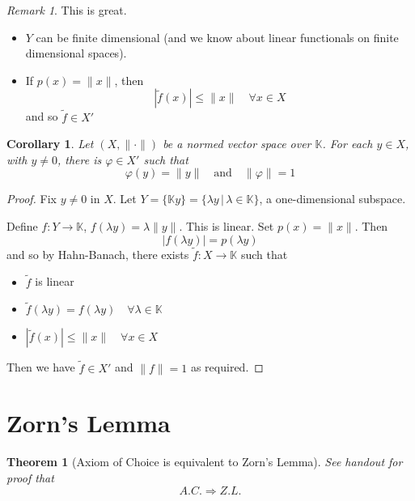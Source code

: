 \documentclass[justified]{tufte-book}
\theoremstyle{plain}%
\newtheorem{thm}{Theorem}[chapter]
\newtheorem*{cor}{Corollary}
\theoremstyle{definition}
\theoremstyle{remark}
\newtheorem*{rem}{Remark}
\newcommand{\given}{ \, | \,}
\newcommand{\K}{\mathbb{K}}
\renewcommand{\phi}{\varphi}
\begin{document}
\begin{rem}
  This is great.
  \begin{itemize}
      \item $Y$ can be finite dimensional (and we know about linear functionals on finite dimensional spaces).
      \item If $p(x) = \| x \|$, then \[
          |\tilde f (x) | \leq \|x \| \quad \forall x \in X
      \] and so $\tilde f \in X'$
  \end{itemize}
\end{rem}

\begin{cor}
  Let $(X, \| \cdot \|)$ be a normed vector space over $\K$.  For each $y \in X$, with $y \neq 0$, there is $\phi \in X'$ such that \[
      \phi(y) = \| y \| \quad \text{and} \quad \| \phi \| = 1
  \]
\end{cor}
\begin{proof}
  Fix $y \neq 0$ in $X$.  Let $Y = \{ \K y \} = \{ \lambda y \given \lambda \in \K \}$, a one-dimensional subspace.  
  
  Define $f : Y \rightarrow \K$, $f( \lambda y) = \lambda \| y \|$.  This is linear.  Set $p(x) = \| x \|$.  Then \[
      | f(\lambda y )| = p(\lambda y)
  \] and so by Hahn-Banach, there exists $\tilde f : X \rightarrow \K$ such that
  \begin{itemize}
      \item $\tilde f$ is linear
      \item $\tilde f(\lambda y) = f( \lambda y) \quad \forall \lambda \in \K$
      \item $| \tilde f (x) | \leq \| x \| \quad \forall x \in X$
  \end{itemize}
  Then we  have $\tilde f \in X'$ and $\| f \| = 1$ as required.
\end{proof}


\section{Zorn's Lemma} %
\label{sec:zorn_s_lemma}

\begin{thm}[Axiom of Choice is equivalent to Zorn's Lemma]
  See handout for proof that \[
      A.C. \Rightarrow Z.L.
  \]
\end{thm}
\end{document}
